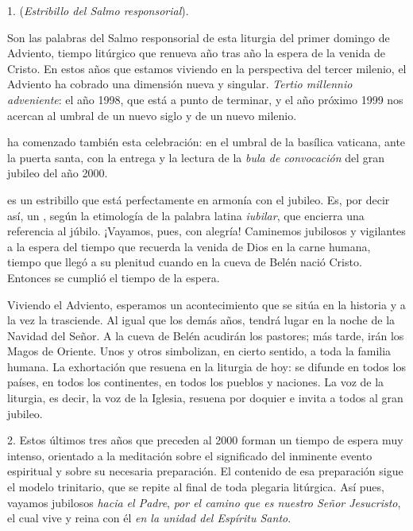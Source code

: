 \begin{body}
1.  (\emph{Estribillo del Salmo responsorial}).

Son las palabras del Salmo responsorial de esta liturgia del primer domingo de Adviento, tiempo litúrgico que renueva año tras año la espera de la venida de Cristo. En estos años que estamos viviendo en la perspectiva del tercer milenio, el Adviento ha cobrado una dimensión nueva y singular. \emph{Tertio millennio adveniente}: el año 1998, que está a punto de terminar, y el año próximo 1999 nos acercan al umbral de un nuevo siglo y de un nuevo milenio.

 ha comenzado también esta celebración: en el umbral de la basílica vaticana, ante la puerta santa, con la entrega y la lectura de la \emph{bula de convocación} del gran jubileo del año 2000.

 es un estribillo que está perfectamente en armonía con el jubileo. Es, por decir así, un , según la etimología de la palabra latina \emph{iubilar}, que encierra una referencia al júbilo. ¡Vayamos, pues, con alegría! Caminemos jubilosos y vigilantes a la espera del tiempo que recuerda la venida de Dios en la carne humana, tiempo que llegó a su plenitud cuando en la cueva de Belén nació Cristo. Entonces se cumplió el tiempo de la espera.

Viviendo el Adviento, esperamos un acontecimiento que se sitúa en la historia y a la vez la trasciende. Al igual que los demás años, tendrá lugar en la noche de la Navidad del Señor. A la cueva de Belén acudirán los pastores; más tarde, irán los Magos de Oriente. Unos y otros simbolizan, en cierto sentido, a toda la familia humana. La exhortación que resuena en la liturgia de hoy:  se difunde en todos los países, en todos los continentes, en todos los pueblos y naciones. La voz de la liturgia, es decir, la voz de la Iglesia, resuena por doquier e invita a todos al gran jubileo.

2. Estos últimos tres años que preceden al 2000 forman un tiempo de espera muy intenso, orientado a la meditación sobre el significado del inminente evento espiritual y sobre su necesaria preparación. El contenido de esa preparación sigue el modelo trinitario, que se repite al final de toda plegaria litúrgica. Así pues, vayamos jubilosos \emph{hacia el Padre}, \emph{por el camino que es nuestro Señor Jesucristo}, el cual vive y reina con él \emph{en la unidad del Espíritu Santo}.


\end{body}
